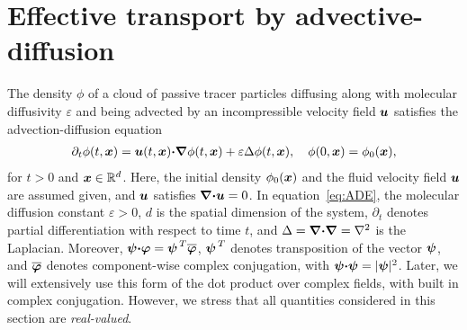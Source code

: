 \documentclass[amsa]{ipart}
\begin{document}
\section{Effective transport by
  advective-diffusion} \label{sec:Eff_Trans}    
%
The density $\phi$ of a cloud of passive tracer particles diffusing along
with molecular diffusivity $\varepsilon$ and being advected by an incompressible
velocity field $\boldsymbol{u}$ satisfies the advection-diffusion equation
%
\begin{align}\label{eq:ADE}
  \partial_t\phi(t,\vecx)
    =\vecu (t,\vecx)\bcdot\bnabla \phi(t,\vecx)+\varepsilon\Delta \phi(t,\vecx),
  \quad
  \phi(0,\vecx)=\phi_0(\vecx),  
\end{align}
%
for $t>0$ and $\boldsymbol{x}\in\mathbb{R}^d$.
Here, the initial density $\phi_0(\boldsymbol{x})$ and the fluid velocity field
$\boldsymbol{u}$ are assumed given, and $\boldsymbol{u}$ satisfies $\mbox{\boldmath${\nabla}$}\mbox{\boldmath${\cdot}$}\boldsymbol{u}=0$.
In equation~\eqref{eq:ADE}, the molecular diffusion constant $\varepsilon>0$,
$d$ is the spatial dimension of the 
system, $\partial_t$ denotes partial differentiation with respect to time
$t$, and $\Delta=\mbox{\boldmath${\nabla}$}\mbox{\boldmath${\cdot}$}\mbox{\boldmath${\nabla}$} =\nabla^2$ is the Laplacian. Moreover, 
$\boldsymbol{\psi}\mbox{\boldmath${\cdot}$}\boldsymbol{\varphi}=\boldsymbol{\psi}^{\,T}\overline{\boldsymbol{\varphi}}$,
$\boldsymbol{\psi}^{\,T}$ denotes transposition of the vector $\boldsymbol{\psi}$, and
$\overline{\boldsymbol{\varphi}}$ denotes component-wise complex conjugation,
with $\boldsymbol{\psi}\mbox{\boldmath${\cdot}$}\boldsymbol{\psi}=|\boldsymbol{\psi}|^2$. Later, we will extensively use this
form of the dot product over complex fields, with built in complex
conjugation. However, we stress that 
all quantities considered in this section are \emph{real-valued}.
\end{document}

